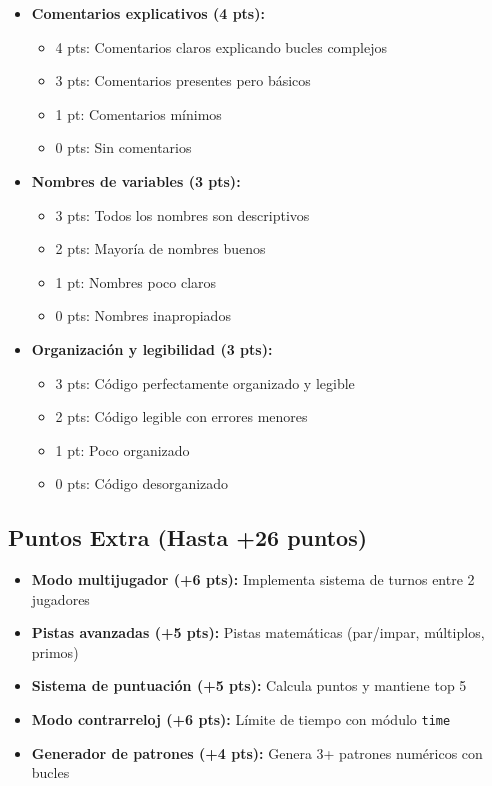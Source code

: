 \documentclass[12pt,a4paper]{article}
\begin{document}
\begin{itemize}[leftmargin=*]
    \item \textbf{Comentarios explicativos (4 pts):}
    \begin{itemize}
        \item 4 pts: Comentarios claros explicando bucles complejos
        \item 3 pts: Comentarios presentes pero básicos
        \item 1 pt: Comentarios mínimos
        \item 0 pts: Sin comentarios
    \end{itemize}
    
    \item \textbf{Nombres de variables (3 pts):}
    \begin{itemize}
        \item 3 pts: Todos los nombres son descriptivos
        \item 2 pts: Mayoría de nombres buenos
        \item 1 pt: Nombres poco claros
        \item 0 pts: Nombres inapropiados
    \end{itemize}
    
    \item \textbf{Organización y legibilidad (3 pts):}
    \begin{itemize}
        \item 3 pts: Código perfectamente organizado y legible
        \item 2 pts: Código legible con errores menores
        \item 1 pt: Poco organizado
        \item 0 pts: Código desorganizado
    \end{itemize}
\end{itemize}

\subsection{Puntos Extra (Hasta +26 puntos)}

\begin{itemize}[leftmargin=*]
    \item \textbf{Modo multijugador (+6 pts):} Implementa sistema de turnos entre 2 jugadores
    \item \textbf{Pistas avanzadas (+5 pts):} Pistas matemáticas (par/impar, múltiplos, primos)
    \item \textbf{Sistema de puntuación (+5 pts):} Calcula puntos y mantiene top 5
    \item \textbf{Modo contrarreloj (+6 pts):} Límite de tiempo con módulo \texttt{time}
    \item \textbf{Generador de patrones (+4 pts):} Genera 3+ patrones numéricos con bucles
\end{itemize}
\end{document}
